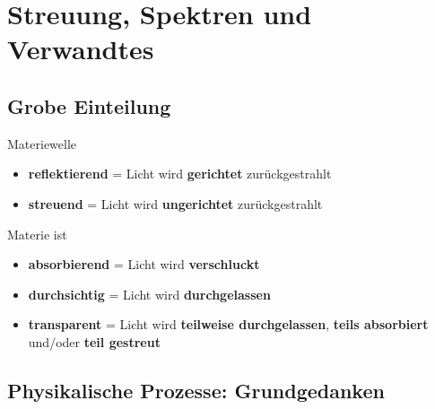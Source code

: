 \section{Streuung, Spektren und Verwandtes}

\subsection{Grobe Einteilung}

Materiewelle
\begin{itemize}
	\item \textbf{reflektierend} = Licht wird \textbf{gerichtet} zurückgestrahlt
	\item \textbf{streuend} = Licht wird \textbf{ungerichtet} zurückgestrahlt
\end{itemize}
Materie ist
\begin{itemize}
	\item \textbf{absorbierend} = Licht wird \textbf{verschluckt}
	\item \textbf{durchsichtig} = Licht wird \textbf{durchgelassen}
	\item \textbf{transparent} = Licht wird \textbf{teilweise durchgelassen}, \textbf{teils absorbiert} und/oder \textbf{teil gestreut}
\end{itemize}

\subsection{Physikalische Prozesse: Grundgedanken}

